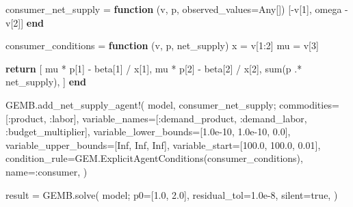 \documentclass[
  letterpaper,
  DIV=11,
  numbers=noendperiod]{scrreprt}
\newenvironment{Shaded}{\begin{snugshade}}{\end{snugshade}}
\newcommand{\ConstantTok}[1]{\textcolor[rgb]{0.56,0.35,0.01}{#1}}
\newcommand{\ControlFlowTok}[1]{\textcolor[rgb]{0.00,0.23,0.31}{\textbf{#1}}}
\newcommand{\DataTypeTok}[1]{\textcolor[rgb]{0.68,0.00,0.00}{#1}}
\newcommand{\FloatTok}[1]{\textcolor[rgb]{0.68,0.00,0.00}{#1}}
\newcommand{\FunctionTok}[1]{\textcolor[rgb]{0.28,0.35,0.67}{#1}}
\newcommand{\KeywordTok}[1]{\textcolor[rgb]{0.00,0.23,0.31}{\textbf{#1}}}
\newcommand{\NormalTok}[1]{\textcolor[rgb]{0.00,0.23,0.31}{#1}}
\newcommand{\OperatorTok}[1]{\textcolor[rgb]{0.37,0.37,0.37}{#1}}
\begin{document}
\begin{codelisting}
{\begin{Shaded}
\begin{Highlighting}[]
\NormalTok{consumer\_net\_supply }\OperatorTok{=} \KeywordTok{function}\NormalTok{ (v, p, observed\_values}\OperatorTok{=}\DataTypeTok{Any}\NormalTok{[])}
\NormalTok{    [}\OperatorTok{{-}}\NormalTok{v[}\FloatTok{1}\NormalTok{], omega }\OperatorTok{{-}}\NormalTok{ v[}\FloatTok{2}\NormalTok{]]}
\KeywordTok{end}

\NormalTok{consumer\_conditions }\OperatorTok{=} \KeywordTok{function}\NormalTok{ (v, p, net\_supply)}
\NormalTok{    x }\OperatorTok{=}\NormalTok{ v[}\FloatTok{1}\OperatorTok{:}\FloatTok{2}\NormalTok{]}
\NormalTok{    mu }\OperatorTok{=}\NormalTok{ v[}\FloatTok{3}\NormalTok{]}

    \ControlFlowTok{return}\NormalTok{ [}
\NormalTok{        mu }\OperatorTok{*}\NormalTok{ p[}\FloatTok{1}\NormalTok{] }\OperatorTok{{-}}\NormalTok{ beta[}\FloatTok{1}\NormalTok{] }\OperatorTok{/}\NormalTok{ x[}\FloatTok{1}\NormalTok{],}
\NormalTok{        mu }\OperatorTok{*}\NormalTok{ p[}\FloatTok{2}\NormalTok{] }\OperatorTok{{-}}\NormalTok{ beta[}\FloatTok{2}\NormalTok{] }\OperatorTok{/}\NormalTok{ x[}\FloatTok{2}\NormalTok{],}
        \FunctionTok{sum}\NormalTok{(p }\OperatorTok{.*}\NormalTok{ net\_supply),}
\NormalTok{    ]}
\KeywordTok{end}

\NormalTok{GEMB.}\FunctionTok{add\_net\_supply\_agent!}\NormalTok{(}
\NormalTok{    model,}
\NormalTok{    consumer\_net\_supply;}
\NormalTok{    commodities}\OperatorTok{=}\NormalTok{[}\OperatorTok{:}\NormalTok{product, }\OperatorTok{:}\NormalTok{labor],}
\NormalTok{    variable\_names}\OperatorTok{=}\NormalTok{[}\OperatorTok{:}\NormalTok{demand\_product, }\OperatorTok{:}\NormalTok{demand\_labor, }\OperatorTok{:}\NormalTok{budget\_multiplier],}
\NormalTok{    variable\_lower\_bounds}\OperatorTok{=}\NormalTok{[}\FloatTok{1.0e{-}10}\NormalTok{, }\FloatTok{1.0e{-}10}\NormalTok{, }\FloatTok{0.0}\NormalTok{],}
\NormalTok{    variable\_upper\_bounds}\OperatorTok{=}\NormalTok{[}\ConstantTok{Inf}\NormalTok{, }\ConstantTok{Inf}\NormalTok{, }\ConstantTok{Inf}\NormalTok{],}
\NormalTok{    variable\_start}\OperatorTok{=}\NormalTok{[}\FloatTok{100.0}\NormalTok{, }\FloatTok{100.0}\NormalTok{, }\FloatTok{0.01}\NormalTok{],}
\NormalTok{    condition\_rule}\OperatorTok{=}\NormalTok{GEM.}\FunctionTok{ExplicitAgentConditions}\NormalTok{(consumer\_conditions),}
\NormalTok{    name}\OperatorTok{=:}\NormalTok{consumer,}
\NormalTok{)}

\NormalTok{result }\OperatorTok{=}\NormalTok{ GEMB.}\FunctionTok{solve}\NormalTok{(}
\NormalTok{    model;}
\NormalTok{    p0}\OperatorTok{=}\NormalTok{[}\FloatTok{1.0}\NormalTok{, }\FloatTok{2.0}\NormalTok{],}
\NormalTok{    residual\_tol}\OperatorTok{=}\FloatTok{1.0e{-}8}\NormalTok{,}
\NormalTok{    silent}\OperatorTok{=}\ConstantTok{true}\NormalTok{,}
\NormalTok{)}


\end{Highlighting}
\end{Shaded}}
\end{codelisting}
\end{document}
